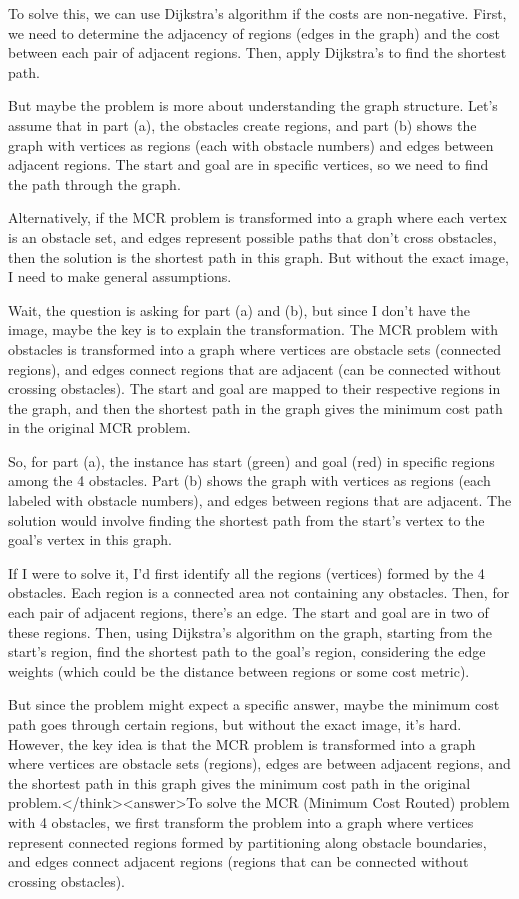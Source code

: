 To solve this, we can use Dijkstra's algorithm if the costs are non-negative. First, we need to determine the adjacency of regions (edges in the graph) and the cost between each pair of adjacent regions. Then, apply Dijkstra's to find the shortest path.

But maybe the problem is more about understanding the graph structure. Let's assume that in part (a), the obstacles create regions, and part (b) shows the graph with vertices as regions (each with obstacle numbers) and edges between adjacent regions. The start and goal are in specific vertices, so we need to find the path through the graph.

Alternatively, if the MCR problem is transformed into a graph where each vertex is an obstacle set, and edges represent possible paths that don't cross obstacles, then the solution is the shortest path in this graph. But without the exact image, I need to make general assumptions.

Wait, the question is asking for part (a) and (b), but since I don't have the image, maybe the key is to explain the transformation. The MCR problem with obstacles is transformed into a graph where vertices are obstacle sets (connected regions), and edges connect regions that are adjacent (can be connected without crossing obstacles). The start and goal are mapped to their respective regions in the graph, and then the shortest path in the graph gives the minimum cost path in the original MCR problem.

So, for part (a), the instance has start (green) and goal (red) in specific regions among the 4 obstacles. Part (b) shows the graph with vertices as regions (each labeled with obstacle numbers), and edges between regions that are adjacent. The solution would involve finding the shortest path from the start's vertex to the goal's vertex in this graph.

If I were to solve it, I'd first identify all the regions (vertices) formed by the 4 obstacles. Each region is a connected area not containing any obstacles. Then, for each pair of adjacent regions, there's an edge. The start and goal are in two of these regions. Then, using Dijkstra's algorithm on the graph, starting from the start's region, find the shortest path to the goal's region, considering the edge weights (which could be the distance between regions or some cost metric).

But since the problem might expect a specific answer, maybe the minimum cost path goes through certain regions, but without the exact image, it's hard. However, the key idea is that the MCR problem is transformed into a graph where vertices are obstacle sets (regions), edges are between adjacent regions, and the shortest path in this graph gives the minimum cost path in the original problem.</think><answer>To solve the MCR (Minimum Cost Routed) problem with 4 obstacles, we first transform the problem into a graph where vertices represent connected regions formed by partitioning along obstacle boundaries, and edges connect adjacent regions (regions that can be connected without crossing obstacles).  

